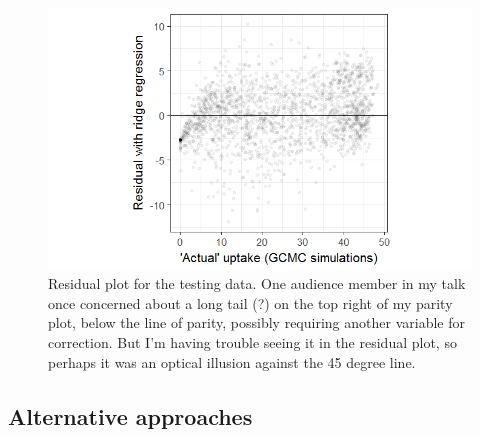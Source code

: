 \documentclass[letterpaper]{article}
\begin{document}
\begin{figure}[H]
	\centering
	\includegraphics[width=0.75\columnwidth]{Figs/residual.png}
	\caption{Residual plot for the testing data.  One audience member in my talk once concerned about a long tail (?) on the top right of my parity plot, below the line of parity, possibly requiring another variable for correction.  But I'm having trouble seeing it in the residual plot, so perhaps it was an optical illusion against the 45 degree line.}
	\label{fig:test_residual}
\end{figure}


\subsection{Alternative approaches}
\end{document}
